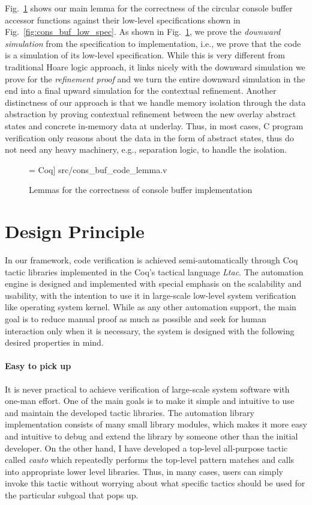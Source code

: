 Fig.~\ref{fig:cons_buf_code_lemma} shows our main lemma for the correctness of
the circular console buffer accessor functions against their low-level specifications
shown in Fig.~\ref{fig:cons_buf_low_spec}. As shown in Fig.~\ref{fig:cons_buf_code_lemma},
we prove the {\it downward simulation} from the specification to implementation, i.e.,
we prove that the code is a simulation of its low-level specification.
While this is very different from traditional Hoare logic approach, it links
nicely with the downward simulation we prove for the {\it refinement proof}
and we turn the entire downward simulation in the end into a final upward simulation
for the contextual refinement. Another distinctness of our approach is that
we handle memory isolation through the data abstraction by proving contextual
refinement between the new overlay abstract states and concrete in-memory
data at underlay. Thus, in most cases, C program verification only reasons
about the data in the form of abstract states, thus do not need any heavy
machinery, e.g., separation logic, to handle the isolation.

\begin{figure}
 = Coq] {src/cons_buf_code_lemma.v}
\caption{Lemmas for the correctness of console buffer implementation}
\label{fig:cons_buf_code_lemma}
\end{figure}

\section{Design Principle}
\label{sec:principle}

In our framework,
code verification is achieved semi-automatically through Coq tactic libraries
implemented in the Coq's tactical language \emph{Ltac}. 
The automation engine is designed and implemented with special emphasis on
the scalability and usability, with the intention to use it in large-scale
low-level system verification like operating system kernel.
While as any other automation support, the main goal is to reduce manual proof as much as
possible and seek for human interaction only when it is necessary,
the system is designed with the following desired properties in mind.

\paragraph{Easy to pick up}

It is never practical to achieve verification of large-scale system software
with one-man effort. One of the main goals is to make it simple and intuitive
to use and maintain the developed tactic libraries. 
The automation library implementation consists of many small library modules, which
makes it more easy and intuitive to debug and extend the library by someone
other than the initial developer. On the other hand, I have developed a top-level
all-purpose tactic called {\it cauto} which repeatedly performs the top-level
pattern matches and calls into appropriate lower level libraries.
Thus, in many cases, users can simply invoke this tactic without worrying about
what specific tactics should be used for the particular subgoal that pops up.


